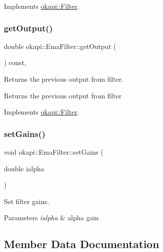Implements \mbox{\hyperlink{classokapi_1_1Filter_a7c2ea0b64b37b688900189856d58da15}{okapi\+::\+Filter}}.

\mbox{\label{classokapi_1_1EmaFilter_a883bc02a7244be54f947b6daaa63c0fe}} 
\subsubsection{\texorpdfstring{getOutput()}{getOutput()}}
{\footnotesize\ttfamily double okapi\+::\+Ema\+Filter\+::get\+Output (\begin{DoxyParamCaption}{ }\end{DoxyParamCaption}) const\hspace{0.3cm}{\ttfamily [override]}, {\ttfamily [virtual]}}

Returns the previous output from filter.

\begin{DoxyReturn}{Returns}
the previous output from filter 
\end{DoxyReturn}


Implements \mbox{\hyperlink{classokapi_1_1Filter_a3469cd4bc108f8accf300d9f5cc9f42f}{okapi\+::\+Filter}}.

\mbox{\label{classokapi_1_1EmaFilter_a7a06fdf0d25a489ac0bfc1a6a20b7d9f}} 
\subsubsection{\texorpdfstring{setGains()}{setGains()}}
{\footnotesize\ttfamily void okapi\+::\+Ema\+Filter\+::set\+Gains (\begin{DoxyParamCaption}\item[{double}]{ialpha }\end{DoxyParamCaption})\hspace{0.3cm}{\ttfamily [virtual]}}

Set filter gains.


\begin{DoxyParams}{Parameters}
{\em ialpha} & alpha gain \\
\hline
\end{DoxyParams}


\subsection{Member Data Documentation}
\mbox{\label{classokapi_1_1EmaFilter_abaf5500df98574b5bf6f8d9a8a4331b5}} 
